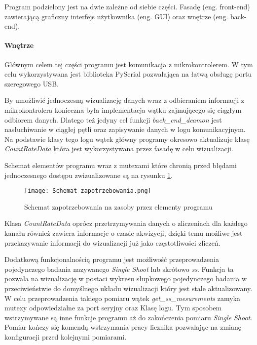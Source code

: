Program podzielony jest na dwie zależne od siebie części. Fasadę (eng. front-end) zawierającą graficzny interfejs użytkownika (eng. GUI) oraz wnętrze (eng. back-end).

\paragraph{Wnętrze}

Głównym celem tej części programu jest komunikacja z mikrokontrolerem. 
W tym celu wykorzystywana jest biblioteka PySerial\cite{pyserial} pozwalająca na łatwą obsługę portu szeregowego USB. 

By umożliwić jednoczesną wizualizację danych wraz z odbieraniem informacji z mikrokontrolera konieczna była implementacja wątku zajmującego się ciągłym odbiorem danych. 
Dlatego też jedyny cel funkcji \textit{back\_end\_deamon} jest nasłuchiwanie w ciągłej pętli oraz zapisywanie danych w logu komunikacyjnym. 
Na podstawie klasy tego logu wątek główny programy okresowo aktualizuje klasę \textit{CountRateData} która jest wykorzystywana przez fasadę w celu wizualizacji. 

Schemat elementów programu wraz z mutexami które chronią przed błędami jednoczesnego dostępu zwizualizowane są na rysunku \ref{program zapotrzebowanie}.

\begin{figure}
        \centering
        \texttt{[image: Schemat\_zapotrzebowania.png]}
        \caption{Schemat zapotrzebowania na zasoby przez elementy programu}
        \label{program zapotrzebowanie}
\end{figure}

Klasa \textit{CountRateData} oprócz przetrzymywania danych o zliczeniach dla każdego kanału również zawiera informacje o czasie akwizycji, dzięki temu możliwe jest przekazywanie informacji do wizualizacji już jako częstotliwości zliczeń. 

Dodatkową funkcjonalnością programu jest możliwość przeprowadzenia pojedynczego badania nazywanego \textit{Single Shoot} lub skrótowo \textit{ss}.
Funkcja ta pozwala na wizualizację w postaci wykresu słupkowego pojedynczego badania w przeciwieństwie do domyślnego układu wizualizacji który jest stale aktualizowany. 
W celu przeprowadzenia takiego pomiaru wątek \textit{get\_ss\_mesurements} zamyka mutexy odpowiedzialne za port seryjny oraz Klasę logu. 
Tym sposobem wstrzymywane są inne funkcje programu aż do zakończenia pomiaru \textit{Single Shoot}.
Pomiar kończy się komendą wstrzymania pracy licznika pozwalając na zmianę konfiguracji przed kolejnymi pomiarami.  

